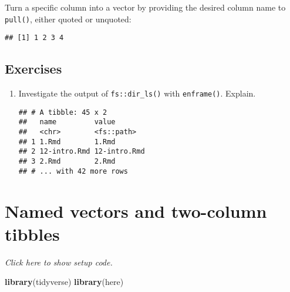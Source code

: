 \documentclass[]{book}
\newenvironment{Shaded}{\begin{snugshade}}{\end{snugshade}}
\newcommand{\CommentTok}[1]{\textcolor[rgb]{0.56,0.35,0.01}{\textit{#1}}}
\newcommand{\KeywordTok}[1]{\textcolor[rgb]{0.13,0.29,0.53}{\textbf{#1}}}
\newcommand{\NormalTok}[1]{#1}
\newcommand{\OperatorTok}[1]{\textcolor[rgb]{0.81,0.36,0.00}{\textbf{#1}}}
\newcommand{\StringTok}[1]{\textcolor[rgb]{0.31,0.60,0.02}{#1}}
\begin{document}
Turn a specific column into a vector by providing the desired column name to \texttt{pull()}, either quoted or unquoted:

\begin{Shaded}
\end{Shaded}

\begin{verbatim}
## [1] 1 2 3 4
\end{verbatim}

\hypertarget{exercises-6}{%
\subsection{Exercises}\label{exercises-6}}

\begin{enumerate}
\def\labelenumi{\arabic{enumi}.}
\item
  Investigate the output of \texttt{fs::dir\_ls()} with \texttt{enframe()}. Explain.

\begin{Shaded}
\end{Shaded}

\begin{verbatim}
## # A tibble: 45 x 2
##   name         value       
##   <chr>        <fs::path>  
## 1 1.Rmd        1.Rmd       
## 2 12-intro.Rmd 12-intro.Rmd
## 3 2.Rmd        2.Rmd       
## # ... with 42 more rows
\end{verbatim}
\end{enumerate}

\hypertarget{names}{%
\section{Named vectors and two-column tibbles}\label{names}}

\emph{Click here to show setup code.}

\begin{Shaded}
\begin{Highlighting}[]
\KeywordTok{library}\NormalTok{(tidyverse)}
\KeywordTok{library}\NormalTok{(here)}
\end{Highlighting}
\end{Shaded}
\end{document}

